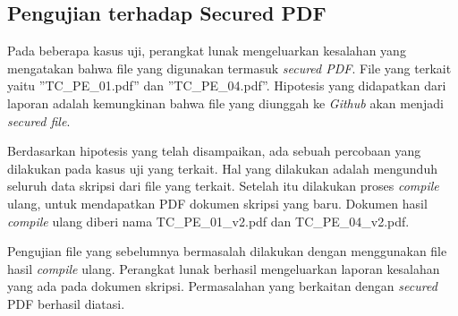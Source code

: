 \subsection{Pengujian terhadap Secured PDF}
Pada beberapa kasus uji, perangkat lunak mengeluarkan kesalahan yang mengatakan bahwa file yang digunakan termasuk \textit{secured PDF}. File yang terkait yaitu ''TC\_PE\_01.pdf'' dan ''TC\_PE\_04.pdf''. Hipotesis yang didapatkan dari laporan adalah kemungkinan bahwa file yang diunggah ke \textit{Github} akan menjadi \textit{secured file}.

Berdasarkan hipotesis yang telah disampaikan, ada sebuah percobaan yang dilakukan pada kasus uji yang terkait. Hal yang dilakukan adalah mengunduh seluruh data skripsi dari file yang terkait. Setelah itu dilakukan proses \textit{compile} ulang, untuk mendapatkan PDF dokumen skripsi yang baru. Dokumen hasil \textit{compile} ulang diberi nama TC\_PE\_01\_v2.pdf dan TC\_PE\_04\_v2.pdf. 

Pengujian file yang sebelumnya bermasalah dilakukan dengan menggunakan file hasil \textit{compile} ulang. Perangkat lunak berhasil mengeluarkan laporan kesalahan yang ada pada dokumen skripsi. Permasalahan yang berkaitan dengan \textit{secured} PDF berhasil diatasi.